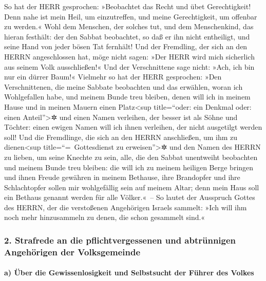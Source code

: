 So hat der HERR gesprochen: »Beobachtet das Recht und übet
Gerechtigkeit! Denn nahe ist mein Heil, um einzutreffen, und meine
Gerechtigkeit, um offenbar zu werden.« Wohl dem Menschen,
der solches tut, und dem Menschenkind, das hieran festhält: der den
Sabbat beobachtet, so daß er ihn nicht entheiligt, und seine Hand von
jeder bösen Tat fernhält! Und der Fremdling, der sich an
den HERRN angeschlossen hat, möge nicht sagen: »Der HERR wird mich
sicherlich aus seinem Volk ausschließen!« Und der Verschnittene sage
nicht: »Ach, ich bin nur ein dürrer Baum!« Vielmehr so hat
der HERR gesprochen: »Den Verschnittenen, die meine Sabbate beobachten
und das erwählen, woran ich Wohlgefallen habe, und meinem Bunde treu
bleiben, denen will ich in meinem Hause und in meinen
Mauern einen Platz\textless sup title=``oder: ein Denkmal oder: einen
Anteil''\textgreater✲ und einen Namen verleihen, der besser ist als
Söhne und Töchter: einen ewigen Namen will ich ihnen verleihen, der
nicht ausgetilgt werden soll! Und die Fremdlinge, die sich
an den HERRN anschließen, um ihm zu dienen\textless sup
title=``=~Gottesdienst zu erweisen''\textgreater✲ und den Namen des
HERRN zu lieben, um seine Knechte zu sein, alle, die den Sabbat
unentweiht beobachten und meinem Bunde treu bleiben: die
will ich zu meinem heiligen Berge bringen und ihnen Freude gewähren in
meinem Bethause, ihre Brandopfer und ihre Schlachtopfer sollen mir
wohlgefällig sein auf meinem Altar; denn mein Haus soll ein Bethaus
genannt werden für alle Völker.«~-- So lautet der
Ausspruch Gottes des HERRN, der die verstoßenen Angehörigen Israels
sammelt: »Ich will ihm noch mehr hinzusammeln zu denen, die schon
gesammelt sind.«

\hypertarget{strafrede-an-die-pflichtvergessenen-und-abtruxfcnnigen-angehuxf6rigen-der-volksgemeinde}{%
\subsubsection{2. Strafrede an die pflichtvergessenen und abtrünnigen
Angehörigen der
Volksgemeinde}\label{strafrede-an-die-pflichtvergessenen-und-abtruxfcnnigen-angehuxf6rigen-der-volksgemeinde}}

\hypertarget{a-uxfcber-die-gewissenlosigkeit-und-selbstsucht-der-fuxfchrer-des-volkes}{%
\paragraph{a) Über die Gewissenlosigkeit und Selbstsucht der Führer des
Volkes}\label{a-uxfcber-die-gewissenlosigkeit-und-selbstsucht-der-fuxfchrer-des-volkes}}

